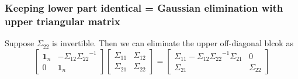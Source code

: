 \documentclass{beamer}
\newcommand{\inverse}[1]{{#1}^{-1}}
\newcommand{\identity}[1]{\bm{1}_n}
\begin{document}
\begin{frame}
    \frametitle{Keeping lower part identical = Gaussian elimination with upper triangular matrix}

    Suppose $\Sigma_{22}$ is invertible. Then we can eliminate the upper off-diagonal blcok as
    \begin{equation}
        \begin{bmatrix}
            \identity{n} & - \Sigma_{12} \inverse{\Sigma_{22}} \\
            0 & \identity{n}
        \end{bmatrix}
        \begin{bmatrix}
            \Sigma_{11} & \Sigma_{12} \\
            \Sigma_{21} & \Sigma_{22}
        \end{bmatrix}
        = %
        \begin{bmatrix}
            \Sigma_{11} - \Sigma_{12} \inverse{\Sigma_{22}} \Sigma_{21} & 0\\
            \Sigma_{21} & \Sigma_{22}
        \end{bmatrix}
    \end{equation}

\end{frame}
\end{document}
